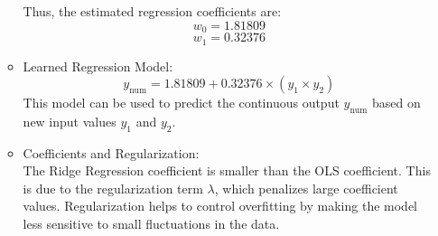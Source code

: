 \documentclass[12pt]{article}
\begin{document}
\begin{enumerate}[leftmargin=\labelsep, label=\textbf{\arabic*.)}]
\begin{itemize}
\begin{minipage}{1\textwidth}
                        Thus, the estimated regression coefficients are:
                        \[
                            w_{\text{0}} = 1.81809
                        \]
                        \[
                            w_{\text{1}} = 0.32376
                        \]

                    \end{minipage}
                    \vspace{0.5em}
              \item Learned Regression Model:
                    \[
                        y_{\text{num}} = 1.81809 + 0.32376 \times (y_1 \times y_2)
                    \]
                    This model can be used to predict the continuous output \( y_{\text{num}} \) based on new input values \( y_1 \) and \( y_2 \).
                    \vspace{0.5em}
              \item Coefficients and Regularization: \\
                    The Ridge Regression coefficient is smaller than the OLS coefficient. This is due to the regularization term $\lambda$, which penalizes large coefficient values. Regularization helps to control overfitting by making the model less sensitive to small fluctuations in the data.

          \end{itemize}


\end{enumerate}
\end{document}
